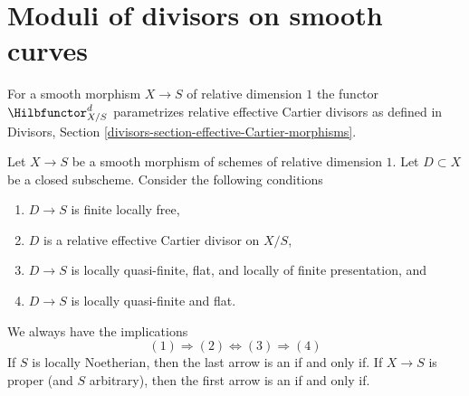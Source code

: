 \section{Moduli of divisors on smooth curves}
\label{section-divisors}

\noindent
For a smooth morphism $X \to S$ of relative dimension $1$ the functor
$\Hilbfunctor^d_{X/S}$ parametrizes relative effective Cartier divisors
as defined in
Divisors, Section \ref{divisors-section-effective-Cartier-morphisms}.

\begin{lemma}
\label{lemma-divisors-on-curves}
Let $X \to S$ be a smooth morphism of schemes of relative dimension $1$.
Let $D \subset X$ be a closed subscheme. Consider the following conditions
\begin{enumerate}
\item $D \to S$ is finite locally free,
\item $D$ is a relative effective Cartier divisor on $X/S$,
\item $D \to S$ is locally quasi-finite, flat, and
locally of finite presentation, and
\item $D \to S$ is locally quasi-finite and flat.
\end{enumerate}
We always have the implications
$$
(1) \Rightarrow (2) \Leftrightarrow (3) \Rightarrow (4)
$$
If $S$ is locally Noetherian, then the last arrow is an if and only if.
If $X \to S$ is proper (and $S$ arbitrary), then the first arrow is
an if and only if.
\end{lemma}

